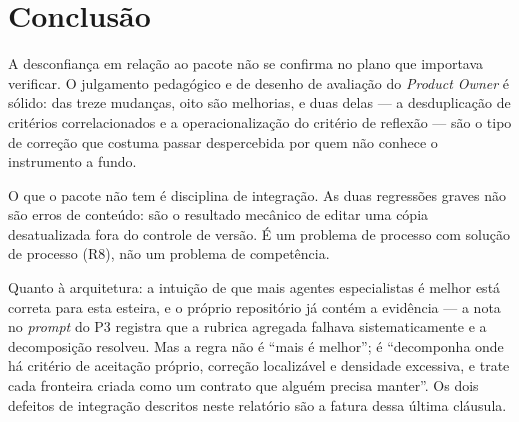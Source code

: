 \documentclass[11pt,a4paper]{article}
\begin{document}
\section{Conclusão}

A desconfiança em relação ao pacote não se confirma no plano que importava verificar. O julgamento
pedagógico e de desenho de avaliação do \textit{Product Owner} é sólido: das treze mudanças, oito são
melhorias, e duas delas --- a desduplicação de critérios correlacionados e a operacionalização do critério
de reflexão --- são o tipo de correção que costuma passar despercebida por quem não conhece o instrumento a
fundo.

O que o pacote não tem é disciplina de integração. As duas regressões graves não são erros de conteúdo: são
o resultado mecânico de editar uma cópia desatualizada fora do controle de versão. É um problema de processo
com solução de processo (R8), não um problema de competência.

Quanto à arquitetura: a intuição de que mais agentes especialistas é melhor está correta para esta esteira,
e o próprio repositório já contém a evidência --- a nota no \textit{prompt} do P3 registra que a rubrica
agregada falhava sistematicamente e a decomposição resolveu. Mas a regra não é ``mais é melhor''; é
``decomponha onde há critério de aceitação próprio, correção localizável e densidade excessiva, e trate cada
fronteira criada como um contrato que alguém precisa manter''. Os dois defeitos de integração descritos
neste relatório são a fatura dessa última cláusula.
\end{document}
